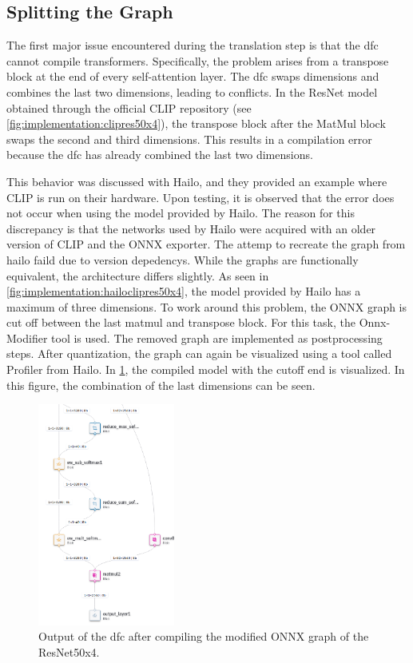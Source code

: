\subsection{Splitting the Graph}

The first major issue encountered during the translation step is that the \acrshort{dfc} cannot compile transformers.
Specifically, the problem arises from a transpose block at the end of every self-attention layer.
The \acrshort{dfc} swaps dimensions and combines the last two dimensions, leading to conflicts.
In the ResNet model obtained through the official CLIP repository (see \cref{fig:implementation:clipres50x4}), the transpose block after the MatMul block swaps the second and third dimensions.
This results in a compilation error because the \acrshort{dfc} has already combined the last two dimensions.

This behavior was discussed with Hailo, and they provided an example where CLIP is run on their hardware. Upon testing, it is observed that the error does not occur when using the model provided by Hailo.
The reason for this discrepancy is that the networks used by Hailo were acquired with an older version of CLIP and the ONNX exporter.
The attemp to recreate the graph from hailo faild due to version depedencys.
While the graphs are functionally equivalent, the architecture differs slightly.
As seen in \cref{fig:implementation:hailoclipres50x4}, the model provided by Hailo has a maximum of three dimensions.
To work around this problem, the ONNX graph is cut off between the last matmul and transpose block.
For this task, the Onnx-Modifier tool \cite{onnxmodifier} is used.
The removed graph are implemented as postprocessing steps.
After quantization, the graph can again be visualized using a tool called Profiler from Hailo.
In \cref{fig:implementation:compareRN50x4qunathar}, the compiled model with the cutoff end is visualized.
In this figure, the combination of the last dimensions can be seen.

\begin{figure}
    \centering
    \includegraphics[width=0.4\textwidth]{Images/Implementation/ClipRes50x4_qunat_Har.png}
    \caption{Output of the \acrshort{dfc} after compiling the modified ONNX graph of the ResNet50x4.}
    \label{fig:implementation:compareRN50x4qunathar}
\end{figure}

